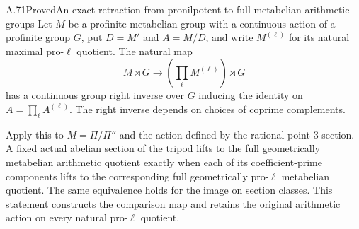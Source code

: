 \begin{statement}{A.71}{Proved}{An exact retraction from pronilpotent to full metabelian arithmetic groups}
Let $M$ be a profinite metabelian group with a continuous action of
a profinite group $G$, put $D=M'$ and $A=M/D$, and write $M^{(\ell)}$
for its natural maximal pro-$\ell$ quotient.  The natural map
\[
 M\rtimes G\longrightarrow
       \left(\prod_\ell M^{(\ell)}\right)\rtimes G
 \tag{A.71.1}
\]
has a continuous group right inverse over $G$ inducing the identity
on $A=\prod_\ell A^{(\ell)}$.
The right inverse depends on choices of coprime complements.

Apply this to $M=\Pi/\Pi''$ and the action defined by the rational
point-$3$ section.  A fixed actual abelian section of the tripod
lifts to the full geometrically metabelian arithmetic quotient
exactly when each of its coefficient-prime components lifts to the
corresponding full geometrically pro-$\ell$ metabelian quotient.
The same equivalence holds for the image on section classes.
This statement constructs the comparison map and retains the
original arithmetic action on every natural pro-$\ell$ quotient.
\end{statement}
